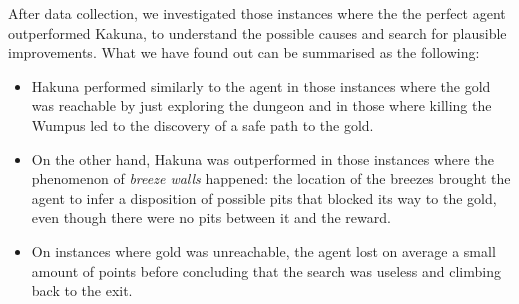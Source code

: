 \documentclass{llncs}
\begin{document}
After data collection, we investigated those instances where the the perfect agent outperformed Kakuna, to understand the possible causes and search for plausible improvements.
What we have found out can be summarised as the following:
\begin{itemize}
	\item Hakuna performed similarly to the agent in those instances where the gold was reachable by just exploring the dungeon and in those where killing the Wumpus led to the discovery of a safe path to the gold.
	\item On the other hand, Hakuna was outperformed in those instances where the phenomenon of \emph{breeze walls} happened: the location of the breezes brought the agent to infer a disposition of possible pits that blocked its way to the gold, even though there were no pits between it and the reward.
	\item On instances where gold was unreachable, the agent lost on average a small amount of points before concluding that the search was useless and climbing back to the exit.
\end{itemize}


\newpage

\appendix
\footnotesize

\begin{multicols}{2}

\end{multicols}


\end{document}
